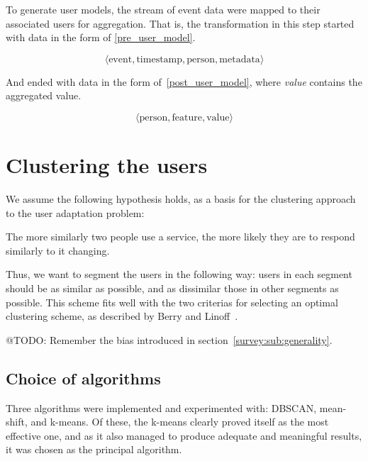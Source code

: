 To generate user models, the stream of event data were mapped to their associated users for aggregation. That is, the transformation in this step started with data in the form of \eqref{pre_user_model}.

\begin{equation}
  \langle \text{event}, \text{timestamp}, \text{person}, \text{metadata} \rangle
  \label{pre_user_model}
\end{equation}

And ended with data in the form of~\eqref{post_user_model}, where \emph{value} contains the aggregated value.

\begin{equation}
  \langle \text{person}, \text{feature}, \text{value} \rangle
  \label{post_user_model}
\end{equation}

\section{Clustering the users}
\label{approach:sec:clustering}

We assume the following hypothesis holds, as a basis for the clustering approach to the user adaptation problem:

\begin{hypothesis}
The more similarly two people use a service, the more likely they are to respond similarly to it changing.
\end{hypothesis}

Thus, we want to segment the users in the following way: users in each segment should be as similar as possible, and as dissimilar those in other segments as possible. This scheme fits well with the two criterias for selecting an optimal clustering scheme, as described by Berry and Linoff~\cite{Berry1997}.

@TODO: Remember the bias introduced in section~\ref{survey:sub:generality}.

\subsection{Choice of algorithms}
\label{approach:sec:clustering_algorithms}

Three algorithms were implemented and experimented with: DBSCAN, mean-shift, and k-means. Of these, the k-means clearly proved itself as the most effective one, and as it also managed to produce adequate and meaningful results, it was chosen as the principal algorithm.

